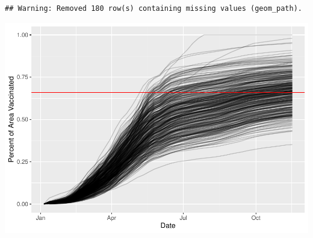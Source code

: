 \documentclass[
]{article}
\begin{document}
\begin{verbatim}
## Warning: Removed 180 row(s) containing missing values (geom_path).
\end{verbatim}

\includegraphics{class17_files/figure-latex/unnamed-chunk-30-1.pdf}
\end{document}
